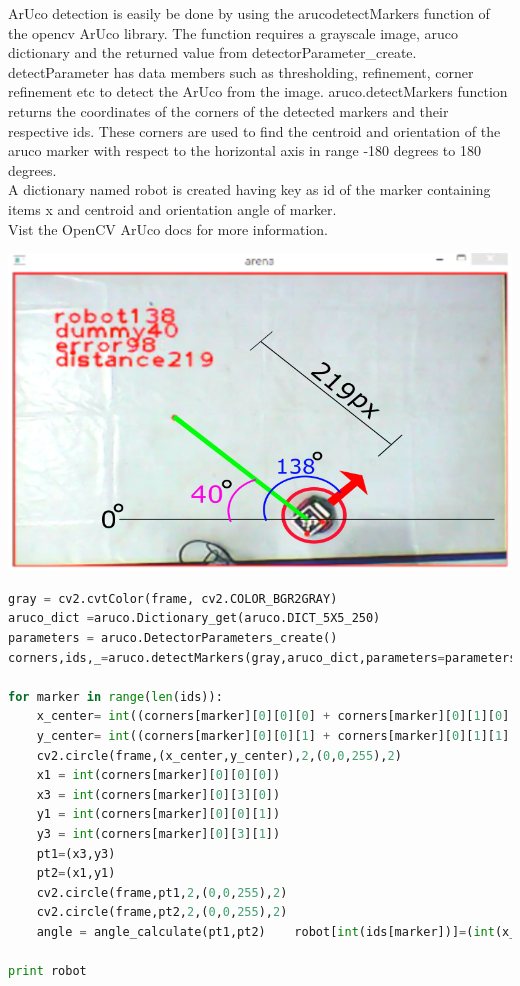 \documentclass[main.tex]{subfiles}
\begin{document}
ArUco detection is easily be done by using the arucodetectMarkers function 
of the opencv ArUco library. The function requires a grayscale image, aruco 
dictionary and the returned value from  detectorParameter\_create. detectParameter 
has data members such as thresholding, refinement, corner refinement etc to 
detect the ArUco from the image.
aruco.detectMarkers function returns the coordinates of the corners of the 
detected markers and their respective ids.
These corners are used to find the centroid and orientation of the aruco 
marker with respect to the horizontal axis in range -180 degrees to 180 
degrees.\\
A dictionary named robot is created having key as id of the marker 
containing items x and centroid and orientation angle of 
marker.\\
Vist the OpenCV ArUco docs for more information. \href{http://docs.opencv.org/3.1.0/d5/dae/tutorial_aruco_detection.html}{\ExternalLink}

\begin{center}
\includegraphics[scale=.5]{images/robot.png}
\end{center}

\begin{lstlisting}[language=Python, caption = Robot id as dictionary key with item centroid and angle]
gray = cv2.cvtColor(frame, cv2.COLOR_BGR2GRAY)
aruco_dict =aruco.Dictionary_get(aruco.DICT_5X5_250)
parameters = aruco.DetectorParameters_create()
corners,ids,_=aruco.detectMarkers(gray,aruco_dict,parameters=parameters)

for marker in range(len(ids)):
	x_center= int((corners[marker][0][0][0] + corners[marker][0][1][0] + corners[marker][0][2][0] + corners[marker][0][3][0])/4)
	y_center= int((corners[marker][0][0][1] + corners[marker][0][1][1] + corners[marker][0][2][1] + corners[marker][0][3][1])/4)
	cv2.circle(frame,(x_center,y_center),2,(0,0,255),2)
	x1 = int(corners[marker][0][0][0])
	x3 = int(corners[marker][0][3][0])
	y1 = int(corners[marker][0][0][1])
	y3 = int(corners[marker][0][3][1])           
	pt1=(x3,y3)
	pt2=(x1,y1)
	cv2.circle(frame,pt1,2,(0,0,255),2)
	cv2.circle(frame,pt2,2,(0,0,255),2)
	angle = angle_calculate(pt1,pt2)	robot[int(ids[marker])]=(int(x_center),int(y_center),int(angle))

print robot
\end{lstlisting}
\end{document}
